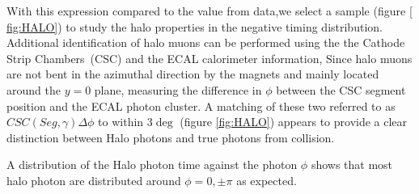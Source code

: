 With this expression compared to the value from data,we select a sample (figure \ref{ fig:HALO}) to study the halo properties in the negative timing distribution. 
Additional identification of halo muons can be performed using the the Cathode Strip Chambers~(CSC) and the ECAL calorimeter information, Since halo muons are not bent in the azimuthal direction by the magnets and mainly located around the $y=0$ plane, measuring the difference in $\phi$ between the CSC segment position and the ECAL photon cluster. A matching of these two referred to as $CSC(Seg,\gamma)\Delta\phi$ to within $3\deg$ (figure \ref{fig:HALO}) appears to provide a clear distinction between Halo photons and true photons from collision.

A distribution of the Halo photon time against the photon $\phi$ shows that most halo photon are distributed around $\phi = 0, \pm \pi$ as expected.

